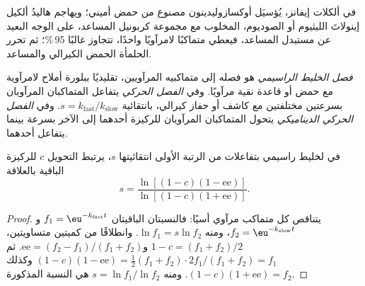 في ألكلات إيفانز، يُؤسيَل أوكسازوليدينون مصنوع من حمض أميني؛
ويهاجم هاليدُ ألكيل إينولاتَ الليثيوم أو الصوديوم، المخلوب مع مجموعة كربونيل المساعد،
على الوجه البعيد عن مستبدل المساعد،
فيعطي متماكبًا لامرآويًا واحدًا،  تتجاوز غالبًا 95\,\%؛ ثم تحرر الحلمأة
الحمض الكيرالي والمساعد.

\begin{definition}[الفصل]\label{def:b3:asymmetric-synthesis:resolution}
\emph{فصل الخليط الراسيمي} هو
فصله إلى متماكبيه المرآويين، تقليديًا ببلورة أملاح لامرآوية
مع حمض أو قاعدة نقية مرآويًا. وفي \emph{الفصل الحركي}
يتفاعل المتماكبان المرآويان بسرعتين مختلفتين مع كاشف أو حفاز كيرالي،
بانتقائية $s = k_{\mathrm{fast}}/k_{\mathrm{slow}}$. وفي \emph{الفصل الحركي
الديناميكي} يتحول المتماكبان المرآويان للركيزة
أحدهما إلى الآخر بسرعة بينما يتفاعل أحدهما.
\end{definition}

\begin{theorem}\label{thm:b3:asymmetric-synthesis:kagan}
في  لخليط راسيمي بتفاعلات من الرتبة الأولى انتقائيتها $s$،
يرتبط التحويل $c$  للركيزة الباقية بالعلاقة
\[
  s = \frac{\ln[(1 - c)(1 - \mathrm{ee})]}{\ln[(1 - c)(1 + \mathrm{ee})]}.
\]
\end{theorem}

\begin{proof}
يتناقص كل متماكب مرآوي أسيًا: فالنسبتان الباقيتان $f_1 = \eu^{-k_{\mathrm{fast}}t}$ 
و$f_2 = \eu^{-k_{\mathrm{slow}}t}$، ومنه $\ln f_1 = s\ln f_2$. وانطلاقًا من كميتين متساويتين، $1 - c = (f_1 + f_2)/2$ 
و$\mathrm{ee} = (f_2 - f_1)/(f_1 + f_2)$. ثم $(1 - c)(1 - \mathrm{ee}) = \tfrac12(f_1 + f_2)\cdot 2f_1/(f_1 + f_2) = f_1$ وكذلك
$(1 - c)(1 + \mathrm{ee}) = f_2$. ومنه $s = \ln f_1/\ln f_2$ هي النسبة المذكورة.
\end{proof}

